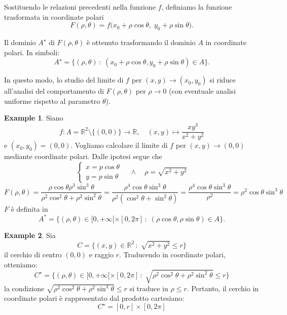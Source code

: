 \documentclass{article}
\theoremstyle{plain}
\theoremstyle{definition}
\newtheorem{exmp}{Example}[section]
\theoremstyle{remark}
\begin{document}
Sostituendo le relazioni precedenti nella funzione \(f\), definiamo la funzione trasformata in coordinate polari
\[
F(\rho,\theta) = f\bigl(x_0+\rho\cos\theta,\;y_0+\rho\sin\theta\bigr).
\]

Il dominio \(A^\star\) di $F(\rho,\theta)$ è ottenuto trasformando il dominio \(A\) in coordinate polari. 
In simboli:
\[A^\star=\{(\rho,\theta)\,:\;(x_0+\rho\cos\theta,y_0+\rho\sin\theta)\in A\}.\]

In questo modo, lo studio del limite di \(f\) per \((x,y)\to(x_0,y_0)\) si riduce all'analisi del comportamento di \(F(\rho,\theta)\) per \(\rho \to 0\) (con eventuale analisi uniforme rispetto al parametro \(\theta\)).

\vspace{10pt}

\begin{exmp}
    Siano 
    \[f:A=\mathbb{R}^2\setminus\{(0,0)\}\to\mathbb{R},\quad (x,y)\mapsto \dfrac{xy^3}{x^2+y^2}\] 
    e \((x_0,y_0)=(0,0)\).
    Vogliamo calcolare il limite di \(f\) per \((x,y)\to(0,0)\) mediante coordinate polari.
    Dalle ipotesi segue che
    \[\begin{cases}
        x=p\cos\theta\\
        y=p\sin\theta
    \end{cases}\quad \land\quad\rho=\sqrt{x^2+y^2}\]    
    \[F(\rho,\theta)=\dfrac{\rho\cos\theta\rho^3\sin^3\theta}{\rho^2\cos^2\theta+\rho^2\sin^2\theta}=\dfrac{\rho^4\cos\theta\sin^3\theta}{\rho^2(\cos^2\theta+\sin^2\theta)}=\dfrac{\rho^4\cos\theta\sin^3\theta}{\rho^2}=\rho^2\cos\theta\sin^3\theta\]
    $F$ è definita in 
    \[A^*=\{(\rho,\theta)\in[0,+\infty[\times[0,2\pi]\,:\;(\rho\cos\theta,\rho\sin\theta)\in A\}.\]
\end{exmp}

\vspace{10pt}

\begin{exmp}
    Sia \[C=\{(x,y)\in\mathbb{R}^2\,:\;\sqrt{x^2+y^2}\leq r\}\]
    il cerchio di centro \((0,0)\) e raggio \(r\).
    Traducendo in coordinate polari, otteniamo:
    \[C^\star=\{(\rho,\theta)\in[0,+\infty[\times[0,2\pi]\,:\;\sqrt{\rho^2\cos^2\theta+\rho^2\sin^2\theta}\leq r\}\]
    la condizione $\sqrt{\rho^2\cos^2\theta+\rho^2\sin^2\theta}\leq r$ si traduce in $\rho\leq r$.
    Pertanto, il cerchio in coordinate polari è rappresentato dal prodotto cartesiano:
    \[C^\star=[0,r]\times[0,2\pi]\]
\end{exmp}

\vspace{10pt}
\end{document}
